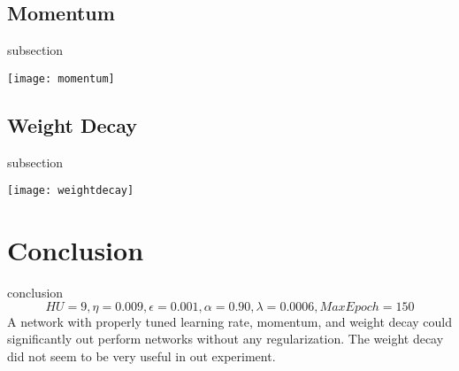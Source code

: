 \documentclass{article}
\begin{document}
\subsection{Momentum}
subsection

\begin{center}
 \texttt{[image: momentum]}
\end{center}



\subsection{Weight Decay}
subsection

\begin{center}
 \texttt{[image: weightdecay]}
\end{center}




\section{Conclusion}
conclusion
\begin{equation*}
HU=9, \eta=0.009, \epsilon=0.001, \alpha=0.90, \lambda=0.0006,  MaxEpoch=150
\end{equation*}
A network with properly tuned learning rate, momentum, and weight decay could significantly out perform networks without any regularization. The weight decay did not seem to be very useful in out experiment.
\end{document}
